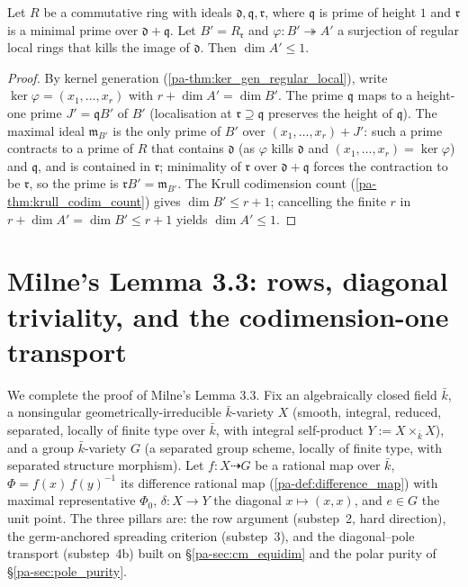 \begin{theorem}
  \label{pa-thm:transport_codim_count}
  \leanok

  Let \(R\) be a commutative ring with ideals \(\mathfrak d, \mathfrak q,
  \mathfrak r\), where \(\mathfrak q\) is prime of height \(1\) and \(\mathfrak r\)
  is a minimal prime over \(\mathfrak d + \mathfrak q\). Let
  \(B' = R_{\mathfrak r}\) and \(\varphi : B' \twoheadrightarrow A'\) a surjection
  of regular local rings that kills the image of \(\mathfrak d\). Then
  \(\dim A' \le 1\).
\end{theorem}
\begin{proof}
  \leanok
  By kernel generation (\ref{pa-thm:ker_gen_regular_local}), write
  \(\ker\varphi = (x_1, \dots, x_r)\) with \(r + \dim A' = \dim B'\). The prime
  \(\mathfrak q\) maps to a height-one prime \(J' = \mathfrak q B'\) of \(B'\)
  (localisation at \(\mathfrak r \supseteq \mathfrak q\) preserves the height of
  \(\mathfrak q\)). The maximal ideal \(\mathfrak m_{B'}\) is the only prime of
  \(B'\) over \((x_1, \dots, x_r) + J'\): such a prime contracts to a prime of
  \(R\) that contains \(\mathfrak d\) (as \(\varphi\) kills \(\mathfrak d\) and
  \((x_1, \dots, x_r) = \ker\varphi\)) and \(\mathfrak q\), and is contained in
  \(\mathfrak r\); minimality of \(\mathfrak r\) over \(\mathfrak d + \mathfrak q\)
  forces the contraction to be \(\mathfrak r\), so the prime is
  \(\mathfrak r B' = \mathfrak m_{B'}\). The Krull codimension count
  (\ref{pa-thm:krull_codim_count}) gives \(\dim B' \le r + 1\); cancelling the
  finite \(r\) in \(r + \dim A' = \dim B' \le r + 1\) yields \(\dim A' \le 1\).
\end{proof}

\section{Milne's Lemma 3.3: rows, diagonal triviality, and the codimension-one
  transport}
\label{pa-sec:milne33_transport}

We complete the proof of Milne's Lemma 3.3. Fix an algebraically closed field
\(\bar k\), a nonsingular geometrically-irreducible \(\bar k\)-variety \(X\)
(smooth, integral, reduced, separated, locally of finite type over \(\bar k\),
with integral self-product \(Y := X \times_{\bar k} X\)), and a group
\(\bar k\)-variety \(G\) (a separated group scheme, locally of finite type, with
separated structure morphism). Let \(f : X \dashrightarrow G\) be a rational map
over \(\bar k\), \(\Phi = f(x)\,f(y)^{-1}\) its difference rational map
(\ref{pa-def:difference_map}) with maximal representative \(\Phi_0\),
\(\delta : X \to Y\) the diagonal \(x \mapsto (x, x)\), and \(e \in G\) the unit
point. The three pillars are: the row argument (substep~2, hard direction), the
germ-anchored spreading criterion (substep~3), and the diagonal--pole transport
(substep~4b) built on \S\ref{pa-sec:cm_equidim} and the polar purity of
\S\ref{pa-sec:pole_purity}.

